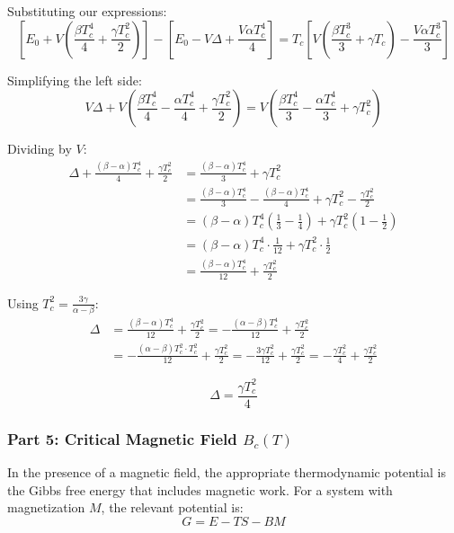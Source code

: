 \documentclass[10pt,twocoloumn]{article}
\begin{document}
Substituting our expressions:
\begin{equation}\left[E_0 + V\left(\frac{\beta T_c^4}{4} + \frac{\gamma T_c^2}{2}\right)\right] - \left[E_0 - V\Delta + \frac{V\alpha T_c^4}{4}\right] = T_c\left[V\left(\frac{\beta T_c^3}{3} + \gamma T_c\right) - \frac{V\alpha T_c^3}{3}\right]\end{equation}

Simplifying the left side:
\begin{equation}V\Delta + V\left(\frac{\beta T_c^4}{4} - \frac{\alpha T_c^4}{4} + \frac{\gamma T_c^2}{2}\right) = V\left(\frac{\beta T_c^4}{3} - \frac{\alpha T_c^4}{3} + \gamma T_c^2\right)\end{equation}

Dividing by $V$:
\begin{align}\Delta + \frac{(\beta - \alpha)T_c^4}{4} + \frac{\gamma T_c^2}{2} &= \frac{(\beta - \alpha)T_c^4}{3} + \gamma T_c^2\\
 &= \frac{(\beta - \alpha)T_c^4}{3} - \frac{(\beta - \alpha)T_c^4}{4} + \gamma T_c^2 - \frac{\gamma T_c^2}{2}\\
 &= (\beta - \alpha)T_c^4\left(\frac{1}{3} - \frac{1}{4}\right) + \gamma T_c^2\left(1 - \frac{1}{2}\right)\\
 &= (\beta - \alpha)T_c^4 \cdot \frac{1}{12} + \gamma T_c^2 \cdot \frac{1}{2}\\
&= \frac{(\beta - \alpha)T_c^4}{12} + \frac{\gamma T_c^2}{2}
\end{align}

Using $T_c^2 = \frac{3\gamma}{\alpha - \beta}$:
\begin{align}\Delta &= \frac{(\beta - \alpha)T_c^4}{12} + \frac{\gamma T_c^2}{2} = -\frac{(\alpha - \beta)T_c^4}{12} + \frac{\gamma T_c^2}{2} \\
 &= -\frac{(\alpha - \beta)T_c^2 \cdot T_c^2}{12} + \frac{\gamma T_c^2}{2} = -\frac{3\gamma T_c^2}{12} + \frac{\gamma T_c^2}{2} = -\frac{\gamma T_c^2}{4} + \frac{\gamma T_c^2}{2}
 \end{align}

\begin{equation}\boxed{\Delta = \frac{\gamma T_c^2}{4}}\end{equation}

\subsubsection*{Part 5: Critical Magnetic Field $B_c(T)$}

In the presence of a magnetic field, the appropriate thermodynamic potential is the Gibbs free energy that includes magnetic work. For a system with magnetization $M$, the relevant potential is:
\begin{equation}G = E - TS - BM\end{equation}
\end{document}
